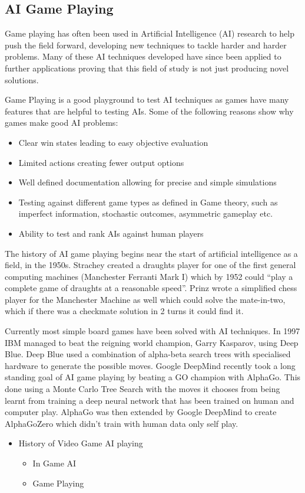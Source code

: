 \documentclass[a4paper]{article}
\begin{document}
\subsection{AI Game Playing}
Game playing has often been used in Artificial Intelligence (AI) research to help push the field forward, developing new techniques to tackle harder and harder problems.
Many of these AI techniques developed have since been applied to further applications proving that this field of study is not just producing novel solutions.
\par
Game Playing is a good playground to test AI techniques as games have many features that are helpful to testing AIs.
Some of the following reasons show why games make good AI problems:
\begin{itemize}[noitemsep,nolistsep]
    \item Clear win states leading to easy objective evaluation
    \item Limited actions creating fewer output options
    \item Well defined documentation allowing for precise and simple simulations
    \item Testing against different game types as defined in Game theory, such as imperfect information, stochastic outcomes, asymmetric gameplay etc.
    \item Ability to test and rank AIs against human players
\end{itemize}
\par
The history of AI game playing begins near the start of artificial intelligence as a field, in the 1950s.
Strachey created a draughts player for one of the first general computing machines (Manchester Ferranti Mark I) which by  1952 could ``play a complete game of draughts at a reasonable speed''\cite{BreifHistoryComputing}.
Prinz wrote a simplified chess player for the Manchester Machine as well which could solve the mate-in-two, which if there was a checkmate solution in 2 turns it could find it\cite{BreifHistoryComputing}.
\par
Currently most simple board games have been solved with AI techniques.
In 1997 IBM managed to beat the reigning world champion, Garry Kasparov, using Deep Blue.
Deep Blue used a combination of alpha-beta search trees with specialised hardware to generate the possible moves\cite{deepBlue}.
Google DeepMind recently took a long standing goal of AI game playing by beating a GO champion with AlphaGo\cite{AlphaGo}.
This done using a Monte Carlo Tree Search with the moves it chooses from being learnt from training a deep neural network that has been trained on human and computer play.
AlphaGo was then extended by Google DeepMind to create AlphaGoZero which didn't train with human data only self play\cite{alphaGoZero}.
\par
\begin{itemize}
    \item History of Video Game AI playing
    \begin{itemize}
        \item In Game AI
        \item Game Playing
    \end{itemize}
\end{itemize}
\end{document}

